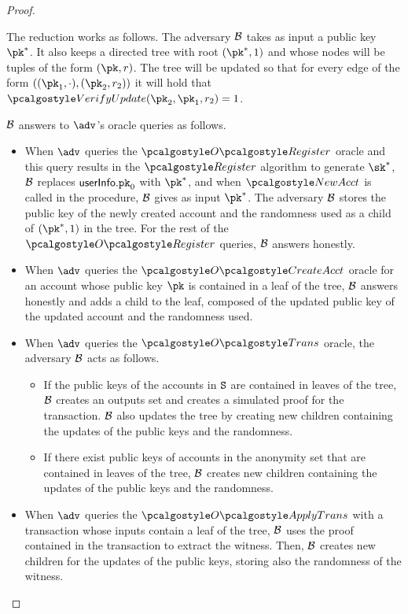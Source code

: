 \begin{proof}
\begin{itemize}
    The reduction works as follows. The adversary $\mathcal{B}$ takes as input a public key $\pk^*$. 
    It also keeps a directed tree with root $(\pk^*, 1)$ and whose nodes will be tuples of the form $(\pk, r)$. The tree will be updated so that for every edge of the form $((\pk_1, \cdot), (\pk_2, r_2))$ it will hold that $\verupd(\pk_2, \pk_1, r_2)=1$. 
    
    $\mathcal{B}$ answers to $\adv$'s oracle queries as follows.
    \begin{itemize}
        \item When $\adv$ queries the $\regOracle$ oracle and this query results in the $\reg$ algorithm to generate $\sk^*$, $\mathcal{B}$ replaces $\textup{\textsf{userInfo}}.\textup{\texttt{pk}}_{0}$ with $\pk^*$, and when $\newacc$ is called in the procedure, $\mathcal{B}$ gives as input $\pk^*$. The adversary $\mathcal{B}$ stores the public key of the newly created account and the randomness used as a child of $(\pk^*, 1)$ in the tree. For the rest of the $\regOracle$ queries, $\mathcal{B}$ answers honestly.
        \item When $\adv$ queries the $\createAcctOracle$ oracle for an account whose public key $\pk$ is contained in a leaf of the tree, $\mathcal{B}$ answers honestly and adds a child to the leaf, composed of the updated public key of the updated account and the randomness used.
        \item When $\adv$ queries the $\transOracle$ oracle, the adversary $\mathcal{B}$ acts as follows.
        \begin{itemize}
            \item If the public keys of the accounts in $\mathtt{S}$ are contained in leaves of the tree, $\mathcal{B}$ creates an outputs set and creates a simulated proof for the transaction. $\mathcal{B}$ also updates the tree by creating new children containing the updates of the public keys and the randomness. 
            \item If there exist public keys of accounts in the anonymity set that are contained in leaves of the tree, $\mathcal{B}$ creates new children containing the updates of the public keys and the randomness.
        \end{itemize}
        \item When $\adv$ queries the $\applytxnOracle$ with a transaction whose inputs contain a leaf of the tree, $\mathcal{B}$ uses the proof contained in the transaction to extract the witness. Then, $\mathcal{B}$ creates new children for the updates of the public keys, storing also the randomness of the witness.

\end{itemize}
\end{itemize}
\end{proof}
